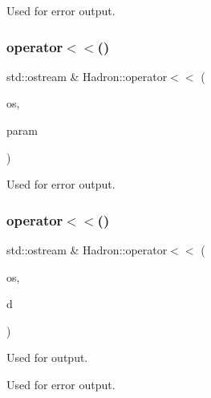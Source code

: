 Used for error output. 

\mbox{\label{namespaceHadron_a1a1ad3c7b1e45f6635516f9f1fcd2684}} 
\subsubsection{\texorpdfstring{operator$<$$<$()}{operator<<()}\hspace{0.1cm}{\footnotesize\ttfamily [13/48]}}
{\footnotesize\ttfamily std\+::ostream \& Hadron\+::operator$<$$<$ (\begin{DoxyParamCaption}\item[{std\+::ostream \&}]{os,  }\item[{const \mbox{\hyperlink{structHadron_1_1KeyParticleOp__t}{Key\+Particle\+Op\+\_\+t}} \&}]{param }\end{DoxyParamCaption})}



Used for error output. 

\mbox{\label{namespaceHadron_af2ff7a4948a4b5cdeaabc1de5072918c}} 
\subsubsection{\texorpdfstring{operator$<$$<$()}{operator<<()}\hspace{0.1cm}{\footnotesize\ttfamily [14/48]}}
{\footnotesize\ttfamily std\+::ostream \& Hadron\+::operator$<$$<$ (\begin{DoxyParamCaption}\item[{std\+::ostream \&}]{os,  }\item[{const \mbox{\hyperlink{structHadron_1_1KeyHadronSUNNPartNPtCorr__t}{Key\+Hadron\+S\+U\+N\+N\+Part\+N\+Pt\+Corr\+\_\+t}} \&}]{d }\end{DoxyParamCaption})}



Used for output. 

Used for error output. \mbox{\label{namespaceHadron_aa874bbfadc5859a87766ccbd07b10f48}} 
